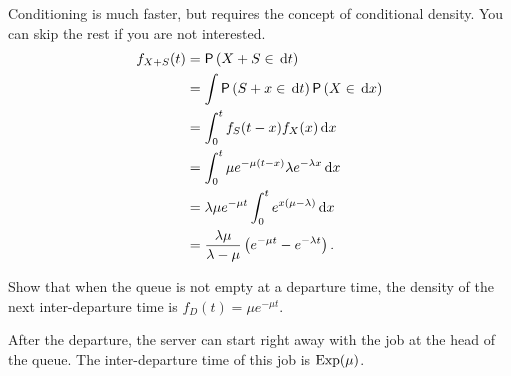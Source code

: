 \begin{extra}
\begin{solution}
Conditioning is much faster, but requires the concept of conditional density. You can skip the rest if you are not interested. 
    \begin{align*}
    f_{X+S}(t) 
&= \P{X+S\in \d{t}} \\
&= \int \P{S+x\in \d{t}}\P{X\in \d{x}} \\
&=\int_0^t f_S(t-x) f_X(x) \d{x} \\
     &= \int_0^t \mu e^{-\mu(t-x)} \lambda e^{-\lambda x} \d{x} \\
     &= \lambda \mu e^{-\mu t} \int_0^t  e^{x(\mu-\lambda)} \d{x} \\
&= \frac{\lambda \mu}{\lambda - \mu}\left(e^{-\mu t} - e^{-\lambda t}\right).
    \end{align*}
\end{solution}
\end{extra}


\begin{extra}
Show  that when the queue is not empty at a departure time, the density of the next inter-departure time is $f_D(t) = \mu e^{-\mu t}$.
\begin{solution}
After the departure, the server can start right away with the job at the head of the queue. The inter-departure time of this job is $\operatorname{Exp}(\mu)$.
\end{solution}
\end{extra}

